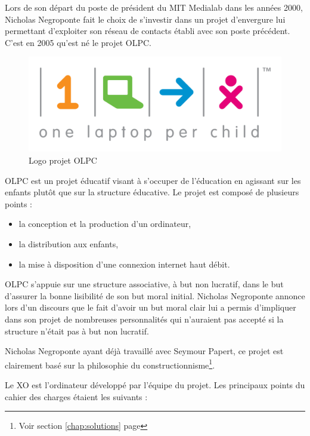 Lors de son départ du poste de président du MIT Medialab dans les années 2000, Nicholas Negroponte fait le choix de s'investir dans un projet d'envergure lui permettant d'exploiter son réseau de contacts établi avec son poste précédent. C'est en 2005 qu'est né le projet \gls{OLPC}.

\begin{figure}[H]
  \centering
  \includegraphics[width=.5\textwidth]{../resources/illustrations/OLPC_logo}
  \caption{Logo projet \gls{OLPC}}
\end{figure}

\gls{OLPC} est un projet éducatif visant à s'occuper de l'éducation en agissant sur les enfants plutôt que sur la structure éducative\cite{ted_olpc_2006,ted_olpc_2008}. Le projet est composé de plusieurs points : 



\begin{itemize}
  \item la conception et la production d'un ordinateur,
  \item la distribution aux enfants,
  \item la mise à disposition d'une connexion internet haut débit.
\end{itemize}

\gls{OLPC} s'appuie sur une structure associative, à but non lucratif, dans le but d'assurer la bonne lisibilité de son but moral initial. Nicholas Negroponte annonce lors d'un discours \cite{ted_olpc_2008} que le fait d'avoir un but moral clair lui a permis d'impliquer dans son projet de nombreuses personnalités qui n'auraient pas accepté si la structure n'était pas à but non lucratif.

Nicholas Negroponte ayant déjà travaillé avec Seymour Papert, ce projet est clairement basé sur la philosophie du constructionnisme\footnote{Voir section \ref{chap:solutions} page \pageref{chap:solutions}}.

Le XO est l'ordinateur développé par l'équipe du projet. Les principaux points du cahier des charges étaient les suivants : 

